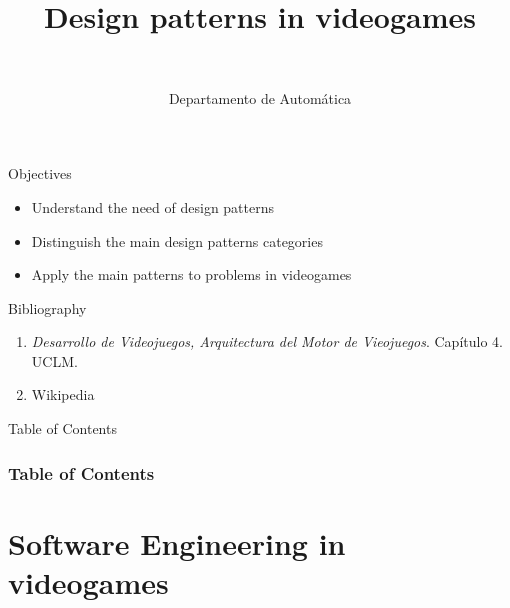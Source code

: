 \documentclass[10pt,compress]{beamer} %
\title[Design patterns in videogames]{Design patterns in videogames}
\author{\asignatura\\\carrera}
\institute{}
\date{Departamento de Automática}
\begin{document}
{\titlepageBlue
    \begin{frame}
        \titlepage
    \end{frame}
}

\institute{\asignatura}

\begin{frame}[plain]{}
   \begin{block}{Objectives}
   \begin{itemize}
        \item Understand the need of design patterns
		\item Distinguish the main design patterns categories
		\item Apply the main patterns to problems in videogames
	\end{itemize}
	\end{block}

   \begin{block}{Bibliography}
      \begin{enumerate}
          \item  \textit{Desarrollo de Videojuegos, Arquitectura del Motor de Vieojuegos}. Capítulo 4. UCLM.
		  \item Wikipedia
      \end{enumerate} 
   \end{block}
\end{frame}

{
\begin{frame}[shrink]{Table of Contents}
 \frametitle{Table of Contents}
 \tableofcontents
\end{frame}
}

\section{Software Engineering in videogames}
\end{document}
